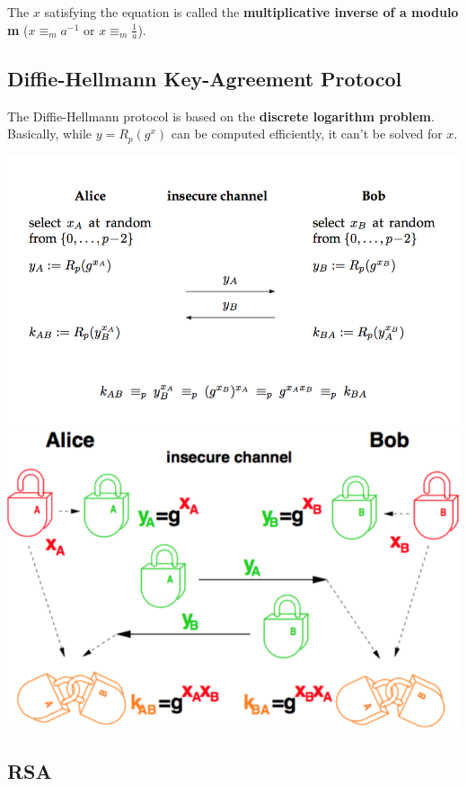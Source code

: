 \documentclass[11pt]{article}
\begin{document}
The $x$ satisfying the equation is called the \textbf{multiplicative inverse of a modulo m} ($x \equiv_m a^{-1}$ or $x \equiv_m \frac{1}{a}$).

\subsection{Diffie-Hellmann Key-Agreement Protocol}

The Diffie-Hellmann protocol is based on the \textbf{discrete logarithm problem}. Basically, while $y = R_p(g^x)$ can be computed efficiently, it can't be solved for $x$.

\begin{center}
	\includegraphics[width=400pt]{images/diffie-hellmann-1}
	\includegraphics[width=400pt]{images/diffie-hellmann-2}
\end{center}

\subsection{RSA}
\end{document}

